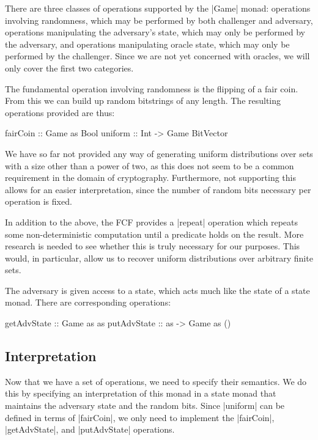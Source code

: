 There are three classes of operations supported by the |Game| monad: operations involving randomness, which may
be performed by both challenger and adversary, operations manipulating the adversary's state, which may only be
performed by the adversary, and operations manipulating oracle state, which may only be performed by the challenger.
Since we are not yet concerned with oracles, we will only cover the first two categories.

The fundamental operation involving randomness is the flipping of a fair coin.  From this we can build up random
bitstrings of any length.  The resulting operations provided are thus:
\begin{code}
fairCoin :: Game as Bool
uniform :: Int -> Game BitVector
\end{code}

We have so far not provided any way of generating uniform distributions over sets with a size other than a power of two,
as this does not seem to be a common requirement in the domain of cryptography.  Furthermore, not supporting this allows
for an easier interpretation, since the number of random bits necessary per operation is fixed.

In addition to the above, the FCF provides a |repeat| operation which repeats some non-deterministic computation until a
predicate holds on the result.  More research is needed to see whether this is truly necessary for our purposes.  This
would, in particular, allow us to recover uniform distributions over arbitrary finite sets.

The adversary is given access to a state, which acts much like the state of a state monad.  There are corresponding
operations:
\begin{code}
getAdvState :: Game as as
putAdvState :: as -> Game as ()
\end{code}

\subsection{Interpretation}

Now that we have a set of operations, we need to specify their semantics.  We do this by specifying an interpretation of
this monad in a state monad that maintains the adversary state and the random bits.  Since |uniform| can be defined in
terms of |fairCoin|, we only need to implement the |fairCoin|, |getAdvState|, and |putAdvState| operations.

\begin{code}

\end{code}




